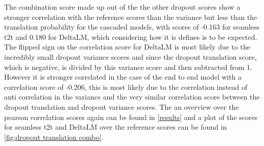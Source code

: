 The combination score made up out of the the other dropout scores show a stronger correlation with the reference scores than the variance but less than the translation probability for the cascaded models, with scores of -0.163 for seamless t2t and 0.180 for DeltaLM, which considering how it is defines is to be expected. 
The flipped sign on the correlation score for DeltaLM is most likely due to the incredibly small dropout variance scores and since the dropout translation score, which is negative, is divided by this variance score and then subtracted from 1.
However it is stronger correlated in the case of the end to end model with a correlation score of -0.206, this is most likely due to the correlation instead of anti correlation in the variance and the very similar correlation score between the dropout translation and dropout variance scores. 
The an overview over the pearson correlation scores again can be found in \autoref{results} and a plot of the scores for seamless t2t and DeltaLM over the reference scores can be found in \autoref{fig:dropout translation combo}. 

